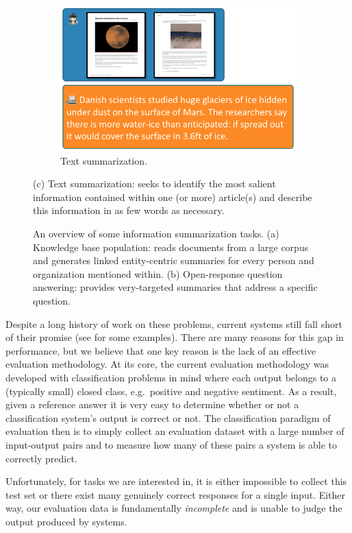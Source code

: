 \begin{figure}
\begin{subfigure}{0.55\textwidth}
    \includegraphics[width=\textwidth]{figures/overview-summarization}
    \caption{\label{fig:intro:overview-summarization} Text summarization. }
  \end{subfigure}

  \caption{\label{fig:intro:overview} An overview of some information summarization tasks.
  (a) Knowledge base population: reads documents from a large corpus and generates linked entity-centric summaries for every person and organization mentioned within.
  (b) Open-response question answering: provides very-targeted summaries that address a specific question.}
  (c) Text summarization: seeks to identify the most salient information contained within one (or more) article(s) and describe this information in as few words as necessary.
\end{figure}

Despite a long history of work on these problems, current systems still fall short of their promise (see  for some \ac{examples}).
There are many reasons for this gap in performance, but we believe that one key reason is the lack of an effective evaluation methodology.
At its core, the current evaluation methodology was developed with classification problems in mind where each output belongs to a (typically small) closed class, e.g.\ positive and negative sentiment.
As a result, given a reference answer it is very easy to determine whether or not a classification system's output is correct or not.
The classification paradigm of evaluation then is to simply collect an evaluation dataset with a large number of input-output pairs and to measure how many of these pairs a system is able to correctly predict.

Unfortunately, for tasks we are interested in, it is either impossible to collect this test set or there exist many genuinely correct responses for a single input.
Either way, our evaluation data is fundamentally \textit{incomplete} and is unable to judge the output produced by systems.


